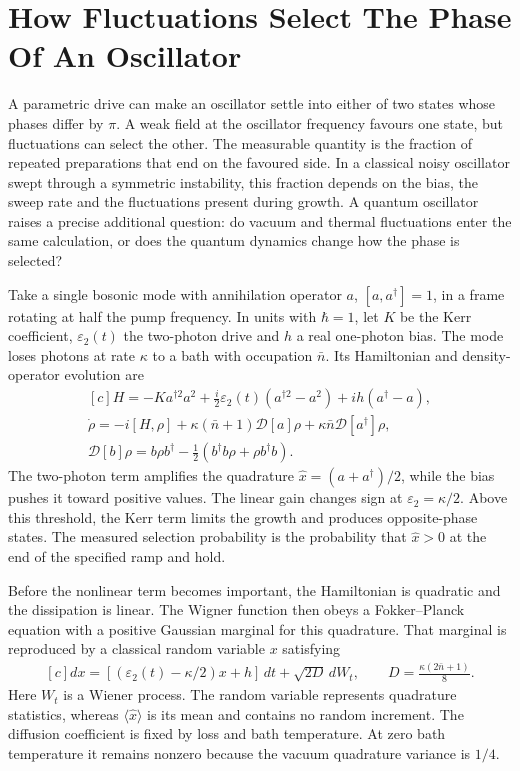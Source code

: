 \documentclass[11pt,oneside]{book}
\newenvironment{centeredalign}{\[\begin{gathered}[c]}{\end{gathered}\]}
\begin{document}
\section{How Fluctuations Select The Phase Of An Oscillator}
A parametric drive can make an oscillator settle into either of two
states whose phases differ by \(\pi\). A weak field at the oscillator
frequency favours one state, but fluctuations can select the other.
The measurable quantity is the fraction of repeated preparations that
end on the favoured side. In a classical noisy oscillator swept
through a symmetric instability, this fraction depends on the bias,
the sweep rate and the fluctuations present during growth. A quantum
oscillator raises a precise additional question: do vacuum and thermal
fluctuations enter the same calculation, or does the quantum dynamics
change how the phase is selected?

Take a single bosonic mode with annihilation operator \(a\),
\([a,a^\dagger]=1\), in a frame rotating at half the pump frequency.
In units with \(\hbar=1\), let \(K\) be the Kerr coefficient,
\(\varepsilon_2(t)\) the two-photon drive and \(h\) a real
one-photon bias. The mode loses photons at rate \(\kappa\) to a
bath with occupation \(\bar n\). Its Hamiltonian and density-operator
evolution are
\begin{centeredalign}
H=-Ka^{\dagger2}a^2
+\tfrac{i}{2}\varepsilon_2(t)(a^{\dagger2}-a^2)
+ih(a^\dagger-a),\\
\dot\rho=-i[H,\rho]
+\kappa(\bar n+1)\mathcal D[a]\rho
+\kappa\bar n\mathcal D[a^\dagger]\rho,\\
\mathcal D[b]\rho=b\rho b^\dagger
-\tfrac12(b^\dagger b\rho+\rho b^\dagger b).
\end{centeredalign}
The two-photon term amplifies the quadrature
\(\widehat x=(a+a^\dagger)/2\), while the bias pushes it toward
positive values. The linear gain changes sign at
\(\varepsilon_2=\kappa/2\). Above this threshold, the Kerr term
limits the growth and produces opposite-phase states. The measured
selection probability is the probability that \(\widehat x>0\)
at the end of the specified ramp and hold.

Before the nonlinear term becomes important, the Hamiltonian is
quadratic and the dissipation is linear. The Wigner function then
obeys a Fokker--Planck equation with a positive Gaussian marginal
for this quadrature. That marginal is reproduced by a classical
random variable \(x\) satisfying
\begin{centeredalign}
dx=[(\varepsilon_2(t)-\kappa/2)x+h]\,dt+\sqrt{2D}\,dW_t,
\qquad D=\frac{\kappa(2\bar n+1)}{8}.
\end{centeredalign}
Here \(W_t\) is a Wiener process. The random variable represents
quadrature statistics, whereas \(\langle\widehat x\rangle\)
is its mean and contains no random increment. The diffusion
coefficient is fixed by loss and bath temperature. At zero bath
temperature it remains nonzero because the vacuum quadrature
variance is \(1/4\).
\end{document}
